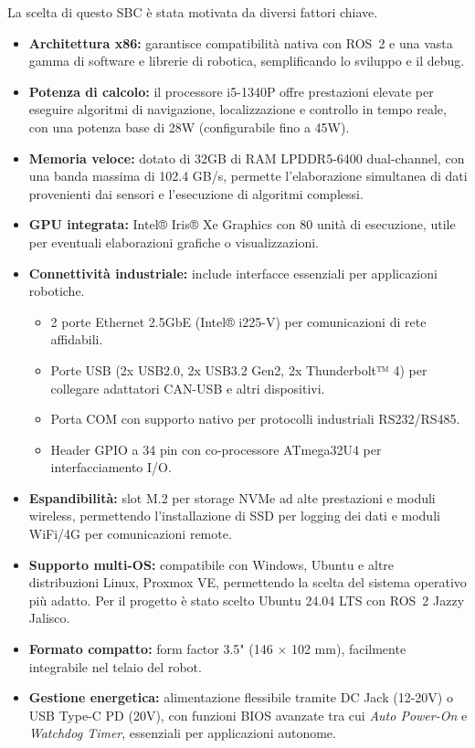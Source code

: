 La scelta di questo SBC è stata motivata da diversi fattori chiave.
\begin{itemize}
    \item \textbf{Architettura x86:} garantisce compatibilità nativa con ROS~2 e una vasta gamma di software e librerie di robotica, semplificando lo sviluppo e il debug.
    \item \textbf{Potenza di calcolo:} il processore i5-1340P offre prestazioni elevate per eseguire algoritmi di navigazione, localizzazione e controllo in tempo reale, con una potenza base di 28W (configurabile fino a 45W).
    \item \textbf{Memoria veloce:} dotato di 32GB di RAM LPDDR5-6400 dual-channel, con una banda massima di 102.4 GB/s, permette l'elaborazione simultanea di dati provenienti dai sensori e l'esecuzione di algoritmi complessi.
    \item \textbf{GPU integrata:} Intel® Iris® Xe Graphics con 80 unità di esecuzione, utile per eventuali elaborazioni grafiche o visualizzazioni.
    \item \textbf{Connettività industriale:} include interfacce essenziali per applicazioni robotiche.
          \begin{itemize}
              \item 2 porte Ethernet 2.5GbE (Intel® i225-V) per comunicazioni di rete affidabili.
              \item Porte USB (2x USB2.0, 2x USB3.2 Gen2, 2x Thunderbolt™ 4) per collegare adattatori CAN-USB e altri dispositivi.
              \item Porta COM con supporto nativo per protocolli industriali RS232/RS485.
              \item Header GPIO a 34 pin con co-processore ATmega32U4 per interfacciamento I/O.
          \end{itemize}
    \item \textbf{Espandibilità:} slot M.2 per storage NVMe ad alte prestazioni e moduli wireless, permettendo l'installazione di SSD per logging dei dati e moduli WiFi/4G per comunicazioni remote.
    \item \textbf{Supporto multi-OS:} compatibile con Windows, Ubuntu e altre distribuzioni Linux, Proxmox VE, permettendo la scelta del sistema operativo più adatto. Per il progetto è stato scelto Ubuntu 24.04 LTS con ROS~2 Jazzy Jalisco.
    \item \textbf{Formato compatto:} form factor 3.5" (146 $\times$ 102 mm), facilmente integrabile nel telaio del robot.
    \item \textbf{Gestione energetica:} alimentazione flessibile tramite DC Jack (12-20V) o USB Type-C PD (20V), con funzioni BIOS avanzate tra cui \textit{Auto Power-On} e \textit{Watchdog Timer}, essenziali per applicazioni autonome.
\end{itemize}

